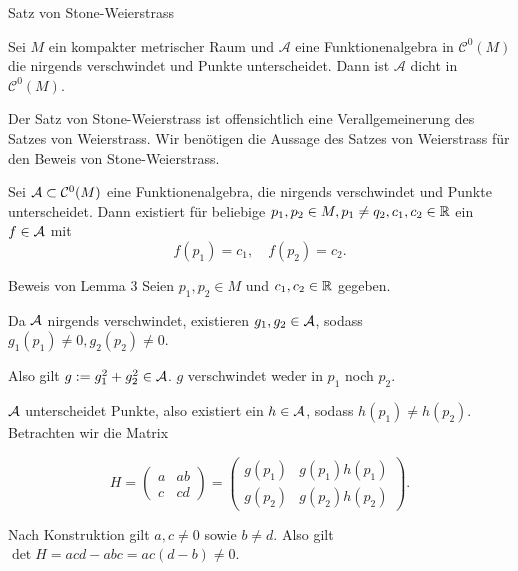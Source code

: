 \begin{frame}{Satz von Stone-Weierstrass}
    \begin{satz}
        Sei \(M\) ein kompakter metrischer Raum und \( \mathcal{A} \) eine 
        Funktionenalgebra in \( \mathcal{C}^0(M) \) die nirgends verschwindet und 
        Punkte unterscheidet. 
        Dann ist \( \mathcal{A} \) dicht in \( \mathcal{C}^0(M) \).
    \end{satz}
    \pause
    \begin{bem}
        Der Satz von Stone-Weierstrass ist offensichtlich eine Verallgemeinerung 
        des Satzes von Weierstrass. 
        Wir benötigen die Aussage des Satzes von Weierstrass für den Beweis von Stone-Weierstrass.
    \end{bem}
\end{frame}

\begin{frame}
    \begin{lem}
        Sei \( \mathcal{A} \subset \mathcal{C}^0(M) \) eine Funktionenalgebra, die nirgends verschwindet 
        und Punkte unterscheidet. 
        Dann existiert für beliebige \( p_1, p_2 \in M, p_1\neq q_2, 
        c_1, c_2 \in \mathbb{R} \)
        ein \(f \in \mathcal{A}\) mit 
        \[ f(p_1) = c_1, \quad f(p_2) = c_2. \]
    \end{lem}
\end{frame}

\begin{frame}{Beweis von Lemma 3}
    Seien \( p_1, p_2 \in M \) und \( c_1, c_2 \in \mathbb{R} \) gegeben. 
    \pause

    Da \(\mathcal{A}\) nirgends verschwindet, existieren \( g_1, g_2 \in \mathcal{A} \), 
    sodass 
    \( g_1(p_1) \neq 0, g_2(p_2) \neq 0 \). 
    \pause

    Also gilt \( g := g_1^2 + g_2^2 \in \mathcal{A} \). \(g\) verschwindet weder in \(p_1\) noch \(p_2\).
    \pause 

    \(\mathcal{A}\) unterscheidet Punkte, also existiert ein \( h \in \mathcal{A} \), sodass 
    \( h(p_1) \neq h(p_2) \).
    \pause 
    Betrachten wir die Matrix 

    \[ H = \begin{pmatrix}
        a & ab \\
        c & cd
    \end{pmatrix} = \begin{pmatrix}
        g(p_1) & g(p_1) h(p_1) \\
        g(p_2) & g(p_2) h(p_2)
    \end{pmatrix}. \]

    Nach Konstruktion gilt 
    \( a, c \neq 0 \) sowie \(b \neq d\). Also gilt \( \det H = acd - abc = ac(d - b) \neq 0 \). 
\end{frame}

